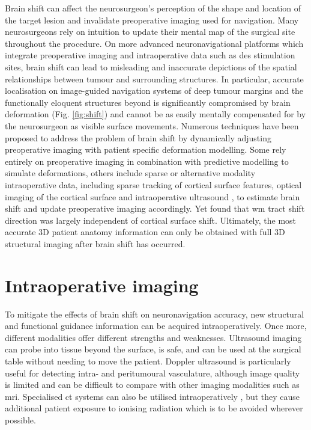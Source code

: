 Brain shift can affect the neurosurgeon's perception of the shape and location of the target lesion and invalidate preoperative imaging used for navigation\autocite{Nimsky2000}.
Many neurosurgeons rely on intuition to update their mental map of the surgical site throughout the procedure.
On more advanced neuronavigational platforms which integrate preoperative imaging and intraoperative data such as \gls{des} stimulation sites, brain shift can lead to misleading and inaccurate depictions of the spatial relationships between tumour and surrounding structures.
In particular, accurate localisation on image-guided navigation systems of deep tumour margins and the functionally eloquent structures beyond is significantly compromised by brain deformation (Fig. \ref{fig:shift}) and cannot be as easily mentally compensated for by the neurosurgeon as visible surface movements\autocite{Nimsky2000}.
Numerous techniques have been proposed to address the problem of brain shift\autocite{Bayer2017b} by dynamically adjusting preoperative imaging with patient specific deformation modelling.
Some rely entirely on preoperative imaging in combination with predictive modelling to simulate deformations, others include sparse or alternative modality intraoperative data, including sparse tracking of cortical surface features\autocite{Luo2019}, optical imaging of the cortical surface\autocite{Skrinjar2002,Audette2005,Fan2017} and intraoperative ultrasound \autocite{Letteboer2005,Reinertsen2007,Bucki2012,Machado2019}, to estimate brain shift and update preoperative imaging accordingly.
Yet \textcite{Yang2017a} found that \gls{wm} tract shift direction was largely independent of cortical surface shift.
Ultimately, the most accurate 3D patient anatomy information can only be obtained with full 3D structural imaging after brain shift has occurred.


\section{Intraoperative imaging}

To mitigate the effects of brain shift on neuronavigation accuracy, new structural and functional guidance information can be acquired intraoperatively.
Once more, different modalities offer different strengths and weaknesses.
Ultrasound imaging can probe into tissue beyond the surface, is safe, and can be used at the surgical table without needing to move the patient\autocite{Elmesallamy2019,Eljamel2016}.
Doppler ultrasound is particularly useful for detecting intra- and peritumoural vasculature\autocite{Steno2016}, although image quality is limited and can be difficult to compare with other imaging modalities such as \gls{mri}\autocite{Eljamel2016}.
Specialised \gls{ct} systems can also be utilised intraoperatively \autocite{Bayer2018}, but they cause additional patient exposure to ionising radiation which is to be avoided wherever possible.

